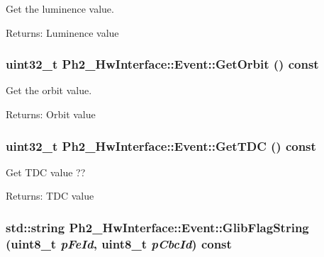 Get the luminence value. 

\begin{Desc}
\item[Returns:]Luminence value \end{Desc}
\hypertarget{class_ph2___hw_interface_1_1_event_02d8bec5f5249cb80e2835e8aff037d7}{
\subsubsection[GetOrbit]{\setlength{\rightskip}{0pt plus 5cm}uint32\_\-t Ph2\_\-Hw\-Interface::Event::Get\-Orbit () const}}
\label{class_ph2___hw_interface_1_1_event_02d8bec5f5249cb80e2835e8aff037d7}


Get the orbit value. 

\begin{Desc}
\item[Returns:]Orbit value \end{Desc}
\hypertarget{class_ph2___hw_interface_1_1_event_2c193b4b2bdb35267f63d03cc684e7b1}{
\subsubsection[GetTDC]{\setlength{\rightskip}{0pt plus 5cm}uint32\_\-t Ph2\_\-Hw\-Interface::Event::Get\-TDC () const}}
\label{class_ph2___hw_interface_1_1_event_2c193b4b2bdb35267f63d03cc684e7b1}


Get TDC value ?? 

\begin{Desc}
\item[Returns:]TDC value \end{Desc}
\hypertarget{class_ph2___hw_interface_1_1_event_8b6a50a409927366a830084f11885882}{
\subsubsection[GlibFlagString]{\setlength{\rightskip}{0pt plus 5cm}std::string Ph2\_\-Hw\-Interface::Event::Glib\-Flag\-String (uint8\_\-t {\em p\-Fe\-Id}, uint8\_\-t {\em p\-Cbc\-Id}) const}}
\label{class_ph2___hw_interface_1_1_event_8b6a50a409927366a830084f11885882}


